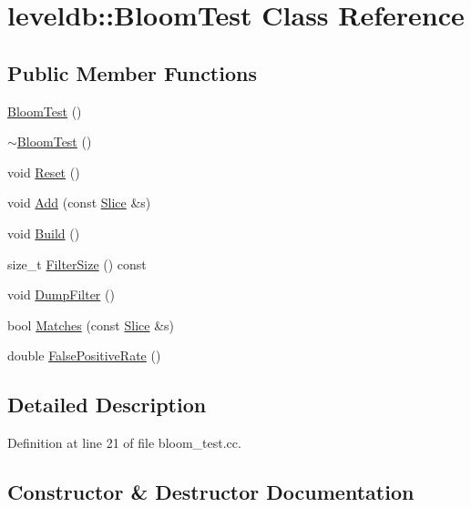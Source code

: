 \hypertarget{classleveldb_1_1_bloom_test}{}\section{leveldb\+:\+:Bloom\+Test Class Reference}
\label{classleveldb_1_1_bloom_test}
\subsection*{Public Member Functions}
\begin{DoxyCompactItemize}
\item 
\hyperlink{classleveldb_1_1_bloom_test_a339a382294295be3e78dfccd25b945fc}{Bloom\+Test} ()
\item 
\hyperlink{classleveldb_1_1_bloom_test_a3370b88a1df119a64ced88ac71bfb6e2}{$\sim$\+Bloom\+Test} ()
\item 
void \hyperlink{classleveldb_1_1_bloom_test_a067ba6753890a5a924edd7efaad7187a}{Reset} ()
\item 
void \hyperlink{classleveldb_1_1_bloom_test_a2f7777014cec7c35f85373e2832bfd88}{Add} (const \hyperlink{classleveldb_1_1_slice}{Slice} \&s)
\item 
void \hyperlink{classleveldb_1_1_bloom_test_ad4fc802152c68599c919d33917523d31}{Build} ()
\item 
size\+\_\+t \hyperlink{classleveldb_1_1_bloom_test_accd2f436396b2324d89043c2a97f0c3a}{Filter\+Size} () const 
\item 
void \hyperlink{classleveldb_1_1_bloom_test_a6f210bc2f2e69c0aeb570fa4dbe4d0da}{Dump\+Filter} ()
\item 
bool \hyperlink{classleveldb_1_1_bloom_test_a1d2a9794bd26ac0124a18511689ef211}{Matches} (const \hyperlink{classleveldb_1_1_slice}{Slice} \&s)
\item 
double \hyperlink{classleveldb_1_1_bloom_test_abf887498db753825b308933df22c0bbb}{False\+Positive\+Rate} ()
\end{DoxyCompactItemize}


\subsection{Detailed Description}


Definition at line 21 of file bloom\+\_\+test.\+cc.



\subsection{Constructor \& Destructor Documentation}
\hypertarget{classleveldb_1_1_bloom_test_a339a382294295be3e78dfccd25b945fc}{}
